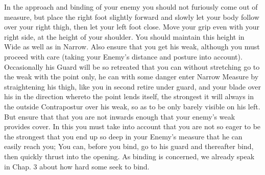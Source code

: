 In the approach and binding of your enemy you should not furiously
come out of measure, but place the right foot slightly forward and
slowly let your body follow over your right thigh, then let your left
foot close. Move your grip even with your right side, at the height of
your shoulder. You should maintain this height in Wide as well as in
Narrow. Also ensure that you get his weak, although you must proceed
with care (taking your Enemy's distance and posture into
account).
Occasionally his Guard will be so retreated that you can without
stretching go to the weak with the point only, he can with some danger
enter Narrow Measure by straightening his thigh, like you in second
retire under guard, and your blade over his in the direction whereto
the point lends itself, the strongest it will always in the outside
Contrapostur over his weak, so as to be only barely visible on his
left. But ensure that that you are not inwards enough that your
enemy's weak provides cover. In this you must take into account that
you are not so eager to be the strongest that you end up so deep in
your Enemy's measure that he can easily reach you; You can, before you
bind, go to his guard and thereafter bind, then quickly thrust into
the opening. As binding is concerned, we already speak in
Chap$.$ 3 about how hard some seek to bind.


